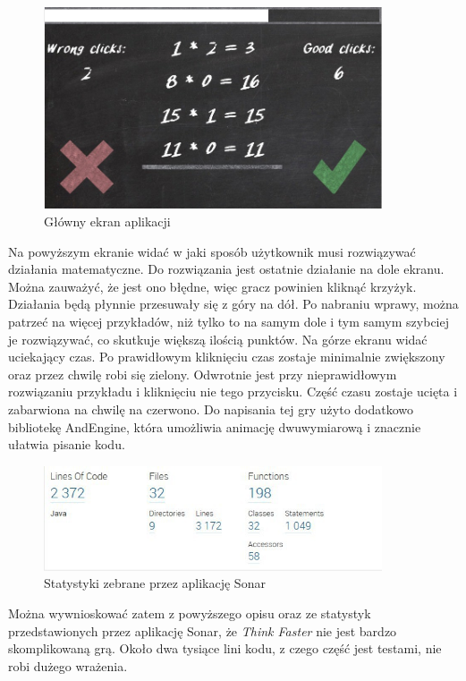 \begin{figure}[H]
\centering\includegraphics[width=10cm]{figures/apps/thinkfaster_newgame}
\caption{Główny ekran aplikacji}
\end{figure}

Na powyższym ekranie widać w jaki sposób użytkownik musi rozwiązywać działania matematyczne. Do rozwiązania jest ostatnie działanie na dole ekranu. Można zauważyć, że jest ono błędne, więc gracz powinien kliknąć krzyżyk. Działania będą płynnie przesuwały się z góry na dół. Po nabraniu wprawy, można patrzeć na więcej przykładów, niż tylko to na samym dole i tym samym szybciej je rozwiązywać, co skutkuje większą ilością punktów. Na górze ekranu widać uciekający czas. Po prawidłowym kliknięciu czas zostaje minimalnie zwiększony oraz przez chwilę robi się zielony. Odwrotnie jest przy nieprawidłowym rozwiązaniu przykładu i kliknięciu nie tego przycisku. Część czasu zostaje ucięta i zabarwiona na chwilę na czerwono. Do napisania tej gry użyto dodatkowo bibliotekę AndEngine, która umożliwia animację dwuwymiarową i znacznie ułatwia pisanie kodu.


\begin{figure}[H]
\centering\includegraphics[width=10cm]{figures/sonarThinkFaster}
\caption{Statystyki zebrane przez aplikację Sonar}
\end{figure}

Można wywnioskować zatem z powyższego opisu oraz ze statystyk przedstawionych przez aplikację Sonar, że \emph{Think Faster} nie jest bardzo skomplikowaną grą. Około dwa tysiące lini kodu, z czego część jest testami, nie robi dużego wrażenia.

